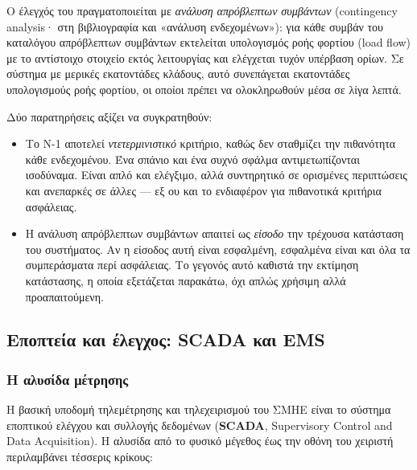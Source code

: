 Ο έλεγχός του πραγματοποιείται με \emph{ανάλυση απρόβλεπτων συμβάντων} (contingency
analysis· στη βιβλιογραφία και «ανάλυση ενδεχομένων»): για κάθε συμβάν του καταλόγου
απρόβλεπτων συμβάντων εκτελείται υπολογισμός ροής φορτίου (load flow) με το αντίστοιχο
στοιχείο εκτός λειτουργίας και ελέγχεται τυχόν υπέρβαση ορίων. Σε σύστημα με μερικές
εκατοντάδες κλάδους, αυτό συνεπάγεται εκατοντάδες υπολογισμούς ροής φορτίου, οι οποίοι
πρέπει να ολοκληρωθούν μέσα σε λίγα λεπτά.

Δύο παρατηρήσεις αξίζει να συγκρατηθούν:

\begin{itemize}
\item Το N-1 αποτελεί \emph{ντετερμινιστικό} κριτήριο, καθώς δεν σταθμίζει την πιθανότητα
      κάθε ενδεχομένου. Ένα σπάνιο και ένα συχνό σφάλμα αντιμετωπίζονται ισοδύναμα. Είναι
      απλό και ελέγξιμο, αλλά συντηρητικό σε ορισμένες περιπτώσεις και ανεπαρκές σε άλλες —
      εξ ου και το ενδιαφέρον για πιθανοτικά κριτήρια ασφάλειας.
\item Η ανάλυση απρόβλεπτων συμβάντων απαιτεί ως \emph{είσοδο} την τρέχουσα κατάσταση του συστήματος.
      Αν η είσοδος αυτή είναι εσφαλμένη, εσφαλμένα είναι και όλα τα συμπεράσματα περί
      ασφάλειας. Το γεγονός αυτό καθιστά την εκτίμηση κατάστασης, η οποία εξετάζεται
      παρακάτω, όχι απλώς χρήσιμη αλλά προαπαιτούμενη.
\end{itemize}

\subsection{Εποπτεία και έλεγχος: SCADA και EMS}

\subsubsection*{Η αλυσίδα μέτρησης}

Η βασική υποδομή τηλεμέτρησης και τηλεχειρισμού του ΣΜΗΕ είναι το σύστημα εποπτικού
ελέγχου και συλλογής δεδομένων (\textbf{SCADA}, Supervisory Control and Data Acquisition). Η αλυσίδα από το φυσικό μέγεθος έως την οθόνη
του χειριστή περιλαμβάνει τέσσερις κρίκους:

